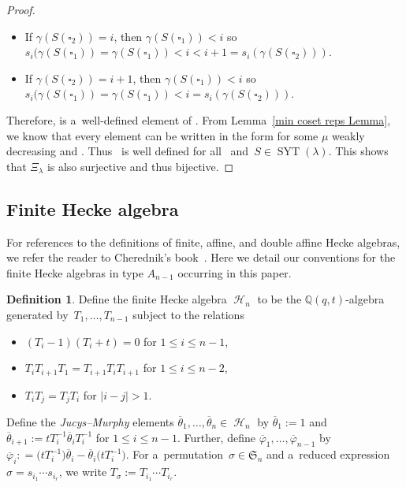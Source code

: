 \documentclass[pdftex]{sigma}
\numberwithin{equation}{section}
\theoremstyle{definition}
\newtheorem{Definition}[Theorem]{Definition}
\DeclareMathOperator{\SYT}{\mathrm{SYT}}
\DeclareMathOperator{\PSYT}{\mathrm{PSYT}_{\geq 0}}
\DeclareMathOperator{\sH}{\mathscr{H}}
\begin{document}
\begin{proof}
\begin{itemize}
 \item If $\gamma(S(\square_2)) = i$, then $\gamma(S(\square_1))< i$ so $s_i(\gamma(S(\square_1)) = \gamma(S(\square_1)) < i < i+1 = s_i(\gamma(S(\square_2)))$.
 \item If $\gamma(S(\square_2)) = i+1$,
 then $\gamma(S(\square_1)) < i$ so $s_i(\gamma(S(\square_1)) = \gamma(S(\square_1)) < i = s_i(\gamma(S(\square_2)))$.
 \end{itemize}
 Therefore,  is a~well-defined element of \smash{$\PSYT(\lambda)$}. From Lemma~\ref{min coset reps Lemma}, we know that every element  can be written in the form  for some $\mu$ weakly decreasing and . Thus~\smash{$\sigma(S) \in \PSYT(\lambda)$} is well defined for all~ and~${S \in \SYT(\lambda)}$.
 This shows that $\Xi_{\lambda}$ is also surjective and thus bijective.
\end{proof}

\subsection{Finite Hecke algebra}
For references to the definitions of finite, affine, and double affine Hecke algebras, we refer the reader to Cherednik's book~\cite{CherednikBook}. Here we detail our conventions for the finite Hecke algebras in type $A_{n-1}$ occurring in this paper.

\begin{Definition}\label{finite hecke alg Definition}
 Define the finite Hecke algebra $\sH_n$ to be the $\mathbb{Q}(q,t)$-algebra generated by~${T_1,\dots, T_{n-1}}$ subject to the relations
 \begin{itemize}\itemsep=0pt
 \item $(T_i-1)(T_i+t) = 0$ for $1\leq i \leq n-1$,
 \item $T_iT_{i+1}T_1 = T_{i+1}T_iT_{i+1}$ for $1\leq i \leq n-2$,
 \item $T_iT_j = T_jT_i$ for $|i-j| > 1$.
 \end{itemize}
 Define the \textit{Jucys--Murphy} elements $\overline{\theta}_1,\dots, \overline{\theta}_n \in \sH_n$ by $\overline{\theta}_1 := 1$ and $\overline{\theta}_{i+1}:= tT_{i}^{-1}\overline{\theta}_{i}T_{i}^{-1}$ for $1\leq i \leq n-1$. Further, define $\overline{\varphi}_1,\dots, \overline{\varphi}_{n-1}$ by $\overline{\varphi}_i: = \bigl(tT_{i}^{-1}\bigr)\overline{\theta}_i - \overline{\theta}_{i}\bigl(tT_i^{-1}\bigr)$. For a~permutation~${\sigma \in \mathfrak{S}_n}$ and a~reduced expression $\sigma = s_{i_1}\cdots s_{i_r}$, we write $T_{\sigma} := T_{i_1}\cdots T_{i_r}$.
\end{Definition}
\end{document}
